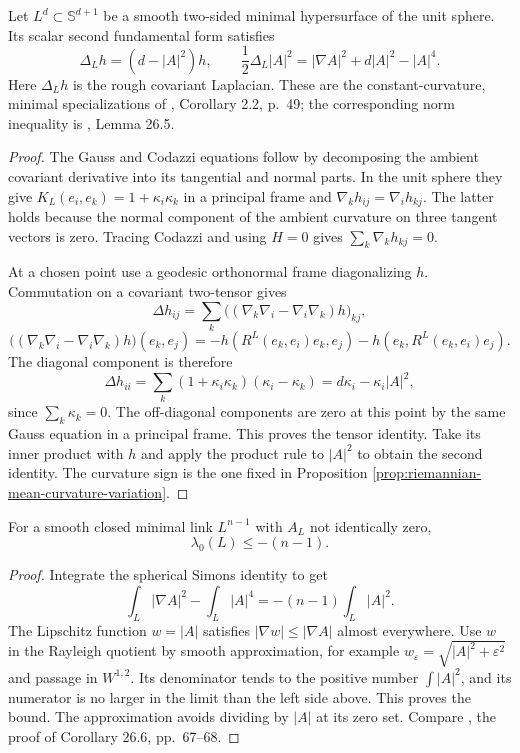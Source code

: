 \begin{theorem}\label{thm:spherical-simons}
Let $L^d\subset\mathbb S^{d+1}$ be a smooth two-sided minimal hypersurface of the unit sphere. Its scalar second fundamental form satisfies
\[
 \Delta_L h=(d-|A|^2)h,\qquad
 \frac12\Delta_L|A|^2=|\nabla A|^2+d|A|^2-|A|^4.
\]
Here $\Delta_Lh$ is the rough covariant Laplacian. These are the constant-curvature, minimal specializations of \cite{HP99}, Corollary 2.2, p.~49; the corresponding norm inequality is \cite{ChMin}, Lemma 26.5.
\end{theorem}
\begin{proof}
The Gauss and Codazzi equations follow by decomposing the ambient covariant derivative into its tangential and normal parts. In the unit sphere they give $K_L(e_i,e_k)=1+\kappa_i\kappa_k$ in a principal frame and $\nabla_kh_{ij}=\nabla_ih_{kj}$. The latter holds because the normal component of the ambient curvature on three tangent vectors is zero. Tracing Codazzi and using $H=0$ gives $\sum_k\nabla_kh_{kj}=0$.

At a chosen point use a geodesic orthonormal frame diagonalizing $h$. Commutation on a covariant two-tensor gives
\[
 \Delta h_{ij}=\sum_k\bigl((\nabla_k\nabla_i-\nabla_i\nabla_k)h\bigr)_{kj},
\]
\[
 \bigl((\nabla_k\nabla_i-\nabla_i\nabla_k)h\bigr)(e_k,e_j)
 =-h(R^L(e_k,e_i)e_k,e_j)-h(e_k,R^L(e_k,e_i)e_j).
\]
The diagonal component is therefore
\[
 \Delta h_{ii}=\sum_k(1+\kappa_i\kappa_k)(\kappa_i-\kappa_k)
 =d\kappa_i-\kappa_i|A|^2,
\]
since $\sum_k\kappa_k=0$. The off-diagonal components are zero at this point by the same Gauss equation in a principal frame. This proves the tensor identity. Take its inner product with $h$ and apply the product rule to $|A|^2$ to obtain the second identity. The curvature sign is the one fixed in Proposition \ref{prop:riemannian-mean-curvature-variation}.
\end{proof}

\begin{proposition}\label{prop:nonflat-link-rayleigh}
For a smooth closed minimal link $L^{n-1}$ with $A_L$ not identically zero,
\[
 \lambda_0(L)\leq-(n-1).
\]
\end{proposition}
\begin{proof}
Integrate the spherical Simons identity to get
\[
 \int_L|\nabla A|^2-\int_L|A|^4
 =-(n-1)\int_L|A|^2.
\]
The Lipschitz function $w=|A|$ satisfies $|\nabla w|\leq|\nabla A|$ almost everywhere. Use $w$ in the Rayleigh quotient by smooth approximation, for example $w_\varepsilon=\sqrt{|A|^2+\varepsilon^2}$ and passage in $W^{1,2}$. Its denominator tends to the positive number $\int|A|^2$, and its numerator is no larger in the limit than the left side above. This proves the bound. The approximation avoids dividing by $|A|$ at its zero set. Compare \cite{ChMin}, the proof of Corollary 26.6, pp.~67--68.
\end{proof}

